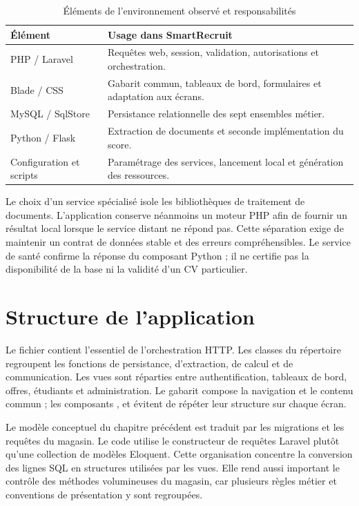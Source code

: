 \begin{table}[H]\centering\small
\caption{Éléments de l'environnement observé et responsabilités}
\begin{tabularx}{\textwidth}{@{}P{3.6cm}Y@{}}\toprule
Élément & Usage dans SmartRecruit\\\midrule
PHP / Laravel & Requêtes web, session, validation, autorisations et orchestration.\\
Blade / CSS & Gabarit commun, tableaux de bord, formulaires et adaptation aux écrans.\\
MySQL / SqlStore & Persistance relationnelle des sept ensembles métier.\\
Python / Flask & Extraction de documents et seconde implémentation du score.\\
Configuration et scripts & Paramétrage des services, lancement local et génération des ressources.\\
\bottomrule\end{tabularx}\end{table}

Le choix d'un service spécialisé isole les bibliothèques de traitement de documents. L'application conserve néanmoins un moteur PHP afin de fournir un résultat local lorsque le service distant ne répond pas. Cette séparation exige de maintenir un contrat de données stable et des erreurs compréhensibles. Le service de santé confirme la réponse du composant Python ; il ne certifie pas la disponibilité de la base ni la validité d'un CV particulier.

\section{Structure de l'application}
Le fichier  contient l'essentiel de l'orchestration HTTP. Les classes du répertoire  regroupent les fonctions de persistance, d'extraction, de calcul et de communication. Les vues sont réparties entre authentification, tableaux de bord, offres, étudiants et administration. Le gabarit  compose la navigation et le contenu commun ; les composants ,  et  évitent de répéter leur structure sur chaque écran.

Le modèle conceptuel du chapitre précédent est traduit par les migrations et les requêtes du magasin. Le code utilise le constructeur de requêtes Laravel plutôt qu'une collection de modèles Eloquent. Cette organisation concentre la conversion des lignes SQL en structures utilisées par les vues. Elle rend aussi important le contrôle des méthodes volumineuses du magasin, car plusieurs règles métier et conventions de présentation y sont regroupées.

